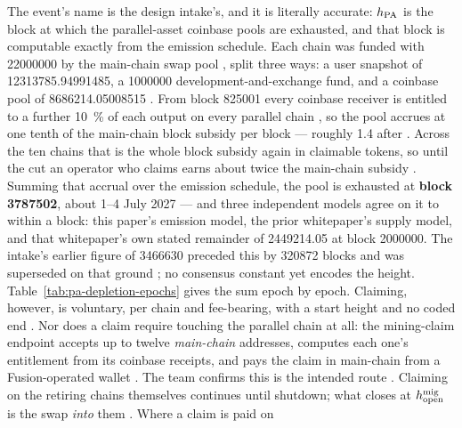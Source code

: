 \begin{remark}
\label{rem:pa-depletion-is-a-cutoff}
The event's name is the design intake's, and it is literally accurate: $h_{\mathrm{PA}}$ is the block at which
the parallel-asset coinbase pools are exhausted, and that block is computable exactly from the
emission schedule. Each chain was funded with \num{22000000}\flux{} by the main-chain
swap pool , split three ways: a user
snapshot of \num{12313785.94991485}\flux{}, a \num{1000000}\flux{} development-and-exchange fund,
and a coinbase pool of \num{8686214.05008515}\flux{} \shipped
{}. From block \num{825001} every coinbase receiver is
entitled to a further \SI{10}{\percent} of each output on every parallel chain
, so the pool accrues at one tenth of the main-chain block
subsidy per block --- roughly \num{1.4}\flux{} after \PoN{}
. Across the ten chains that is the
whole block subsidy again in claimable tokens, so until the cut an operator who claims earns about
twice the main-chain subsidy \srcinferred{}. Summing that accrual over the
emission schedule, the pool is exhausted at \textbf{block \num{3787502}}, about 1--4 July 2027
\srcinferred{} --- and three independent models agree on it to within a block: this paper's
emission model, the prior whitepaper's supply model, and that whitepaper's own stated remainder of
\num{2449214.05}\flux{} at block \num{2000000}. The intake's earlier figure of \num{3466630}
preceded this by \num{320872} blocks and was superseded on that ground
; no consensus constant yet encodes the height.
Table~\ref{tab:pa-depletion-epochs} gives the sum epoch by epoch.
Claiming, however, is voluntary, per chain and fee-bearing, with a start height and no coded end
. Nor does a claim require touching the parallel chain at
all: the mining-claim endpoint accepts up to twelve \emph{main-chain} addresses, computes each one's
entitlement from its coinbase receipts, and pays the claim in main-chain \flux{} from a
Fusion-operated wallet \shipped
{}. The team confirms this is
the intended route . Claiming on the retiring chains themselves continues until shutdown; what closes at $h^{\mathrm{mig}}_{\mathrm{open}}$
is the swap \emph{into} them . Where a claim is paid on

\end{remark}
